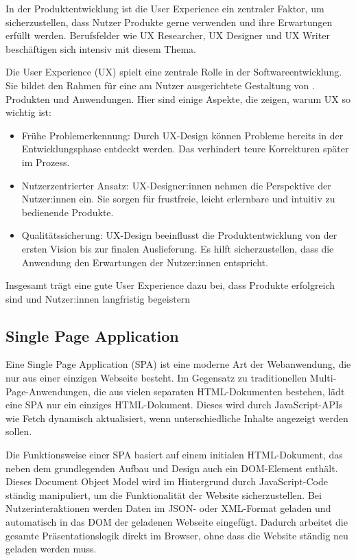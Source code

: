 In der Produktentwicklung ist die User Experience ein zentraler Faktor, um sicherzustellen, dass Nutzer Produkte gerne verwenden und ihre Erwartungen 
erfüllt werden. Berufsfelder wie UX Researcher, UX Designer und UX Writer beschäftigen sich intensiv mit diesem Thema.

Die User Experience (UX) spielt eine zentrale Rolle in der Softwareentwicklung. Sie bildet den Rahmen für eine am Nutzer ausgerichtete Gestaltung von .
Produkten und Anwendungen. Hier sind einige Aspekte, die zeigen, warum UX so wichtig ist:

\begin{itemize}
    \item Frühe Problemerkennung: Durch UX-Design können Probleme bereits in der Entwicklungsphase entdeckt werden. Das verhindert teure Korrekturen später im Prozess.
    \item Nutzerzentrierter Ansatz: UX-Designer:innen nehmen die Perspektive der Nutzer:innen ein. Sie sorgen für frustfreie, leicht erlernbare und intuitiv zu bedienende Produkte.
    \item Qualitätssicherung: UX-Design beeinflusst die Produktentwicklung von der ersten Vision bis zur finalen Auslieferung. Es hilft sicherzustellen, dass die Anwendung den Erwartungen der Nutzer:innen entspricht.

\end{itemize}

Insgesamt trägt eine gute User Experience dazu bei, dass Produkte erfolgreich sind und Nutzer:innen langfristig begeistern
 
\subsection{ Single Page Application }
Eine Single Page Application (SPA) ist eine moderne Art der Webanwendung, die nur aus einer einzigen Webseite besteht. Im 
Gegensatz zu traditionellen Multi-Page-Anwendungen, die aus vielen separaten HTML-Dokumenten bestehen, lädt eine SPA nur ein 
einziges HTML-Dokument. Dieses wird durch JavaScript-APIs wie Fetch dynamisch aktualisiert, wenn unterschiedliche Inhalte 
angezeigt werden sollen.

Die Funktionsweise einer SPA basiert auf einem initialen HTML-Dokument, das neben dem grundlegenden Aufbau und Design auch ein
DOM-Element enthält. Dieses Document Object Model wird im Hintergrund durch JavaScript-Code ständig manipuliert, um die 
Funktionalität der Website sicherzustellen. Bei Nutzerinteraktionen werden Daten im JSON- oder XML-Format geladen und 
automatisch in das DOM der geladenen Webseite eingefügt. Dadurch arbeitet die gesamte Präsentationslogik direkt im Browser, 
ohne dass die Website ständig neu geladen werden muss.


